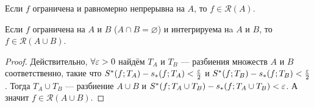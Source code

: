 \begin{Consequence}
    Если $f$ ограничена и равномерно непрерывна на $A$, то $f \in \mathcal{R}(A)$. 
\end{Consequence}
\begin{Consequence}
    Если $f$ ограничена на $A$ и $B$ ($A \cap B = \varnothing$) и интегрируема нa $A$ и $B$, то $f \in \mathcal{R}(A \cup B)$.
\end{Consequence}
\begin{proof}
    Действительно, $\forall \varepsilon>0$ найдём $T_A$ и $T_B$ --- разбиения множеств $A$ и $B$ соответственно, такие что $S^*(f; T_A) - s_*(f; T_A) < \frac{\varepsilon}{2}$ и $S^*(f; T_B) - s_*(f; T_B) < \frac{\varepsilon}{2}$. Тогда $T_A \cup T_B$ --- разбиение $A\cup B$ и $S^*(f; T_A \cup T_B) - s_*(f; T_A \cup T_B) < \varepsilon$. А значит $f \in \mathcal{R}(A \cup B)$.
\end{proof}


